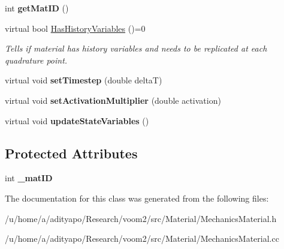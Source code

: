 \begin{DoxyCompactItemize}
\item 
\hypertarget{classvoom_1_1_mechanics_material_ac2337249b845f90695efdec24b61b4c8}{
int {\bfseries getMatID} ()}
\label{classvoom_1_1_mechanics_material_ac2337249b845f90695efdec24b61b4c8}

\item 
\hypertarget{classvoom_1_1_mechanics_material_a3c962d203b86f8ea092e8a754c01e2cb}{
virtual bool \hyperlink{classvoom_1_1_mechanics_material_a3c962d203b86f8ea092e8a754c01e2cb}{HasHistoryVariables} ()=0}
\label{classvoom_1_1_mechanics_material_a3c962d203b86f8ea092e8a754c01e2cb}

\begin{DoxyCompactList}\small\item\em Tells if material has history variables and needs to be replicated at each quadrature point. \item\end{DoxyCompactList}\item 
\hypertarget{classvoom_1_1_mechanics_material_a62f35b54a8a6b590fd6662e8b55d9db9}{
virtual void {\bfseries setTimestep} (double deltaT)}
\label{classvoom_1_1_mechanics_material_a62f35b54a8a6b590fd6662e8b55d9db9}

\item 
\hypertarget{classvoom_1_1_mechanics_material_a75b6c9b2df647b98b4bb09e7e3cfecc5}{
virtual void {\bfseries setActivationMultiplier} (double activation)}
\label{classvoom_1_1_mechanics_material_a75b6c9b2df647b98b4bb09e7e3cfecc5}

\item 
\hypertarget{classvoom_1_1_mechanics_material_a8311a571d358803ff8c9d70ce060984b}{
virtual void {\bfseries updateStateVariables} ()}
\label{classvoom_1_1_mechanics_material_a8311a571d358803ff8c9d70ce060984b}

\end{DoxyCompactItemize}
\subsection*{Protected Attributes}
\begin{DoxyCompactItemize}
\item 
\hypertarget{classvoom_1_1_mechanics_material_a62ee931a1815b63a8e70cdf3c89ef680}{
int {\bfseries \_\-matID}}
\label{classvoom_1_1_mechanics_material_a62ee931a1815b63a8e70cdf3c89ef680}

\end{DoxyCompactItemize}


The documentation for this class was generated from the following files:\begin{DoxyCompactItemize}
\item 
/u/home/a/adityapo/Research/voom2/src/Material/MechanicsMaterial.h\item 
/u/home/a/adityapo/Research/voom2/src/Material/MechanicsMaterial.cc\end{DoxyCompactItemize}
